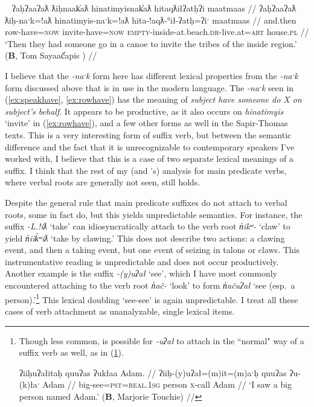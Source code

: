 \ex~ \label{ex:rowhave}
\begingl
\glpreamble ʔaḥʔaaʔaƛ ƛiḥnaak̓aƛ hinatimyisnak̓aƛ hitaqƛiłʔatḥʔi maatmaas //
\gla ʔaḥʔaaʔaƛ ƛiḥ-naˑk=!aƛ hinatimyis-naˑk=!aƛ hita-!aqƛ-°ił-ʔatḥ=ʔiˑ maatmaas //
\glb and.then row-have=\textsc{now} invite-have=\textsc{now} \textsc{empty}-inside-at.beach.\textsc{dr}-live.at=\textsc{art} house.\textsc{pl} //
\glft `Then they had someone go in a canoe to invite the tribes of the inside region.' (\textbf{B}, Tom Sayaač̓apis \citealt[p.~297--298]{sapir1955}) //
\endgl
\xe

\vspace{-5pt}

I believe that the \textit{-naˑk} form here has different lexical properties from the \textit{-naˑk} form discussed above that is in use in the modern language. The \textit{-naˑk} seen in (\ref{ex:speakhave}, \ref{ex:rowhave}) has the meaning of \textit{subject have someone do X on subject's behalf}. It appears to be productive, as it also occurs on \textit{hinatimyis} `invite' in (\ref{ex:rowhave}), and a few other forms as well in the Sapir-Thomas texts. This is a very interesting form of suffix verb, but between the semantic difference and the fact that it is unrecognizable to contemporary speakers I've worked with, I believe that this is a case of two separate lexical meanings of a suffix. I think that the rest of my (and \citeauthor{wojdak2005}'s) analysis for main predicate verbs, where verbal roots are generally not seen, still holds.

Despite the general rule that main predicate suffixes do not attach to verbal roots, some in fact do, but this yields unpredictable semantics. For instance, the suffix \textit{-L.!iƛ} `take' can idiosyncratically attach to the verb root \textit{n̓ikʷ-} `claw' to yield \textit{n̓iik̓ʷiƛ} `take by clawing.' This does not describe two actions: a clawing event, and then a taking event, but one event of seizing in talons or claws. This instrumentative reading is unpredictable and does not occur productively. Another example is the suffix \textit{-(y)uʔał} `see', which I have most commonly encountered attaching to the verb root \textit{n̓ač-} `look' to form \textit{n̓ačuʔał} `see (esp.\ a person).'\footnote{Though less common, is possible for \textit{-uʔał} to attach in the ``normal" way of a suffix verb as well, as in (\ref{ex:sawabigman}).

\ex \label{ex:sawabigman}
\begingl
\glpreamble ʔiiḥuʔałitaḥ quuʔas ʔukłaa Adam. //
\gla ʔiiḥ-(y)uʔał=(m)it=(m)aˑḥ quuʔas ʔu-(k)łaˑ Adam //
\glb big-see=\textsc{pst}=\textsc{real.1sg} person \textsc{x}-call Adam //
\glft `I saw a big person named Adam.' (\textbf{B}, Marjorie Touchie) //
\endgl
\xe
} This lexical doubling `see-see' is again unpredictable. I treat all these cases of verb attachment as unanalyzable, single lexical items.

